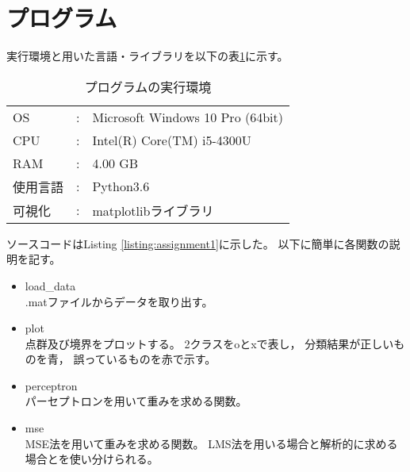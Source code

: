 \documentclass[class=jsarticle, crop=false, dvipdfmx, fleqn]{standalone}
\begin{document}
\section{プログラム}

実行環境と用いた言語・ライブラリを以下の表\ref{tab:cp_env}に示す。

\begin{table}[H]
    \centering
    \caption{プログラムの実行環境}
    \begin{tabular}{lcl}
        OS & : & Microsoft Windows 10 Pro (64bit) \\
        CPU & : & Intel(R) Core(TM) i5-4300U \\
        RAM & : & 4.00 GB \\
        使用言語 & : & Python3.6 \\
        可視化 & : & matplotlibライブラリ
    \end{tabular}
    \label{tab:cp_env}
\end{table}


ソースコードはListing \ref{listing:assignment1}に示した。
以下に簡単に各関数の説明を記す。

\begin{itemize}
    \item load\_data \\
        .matファイルからデータを取り出す。
    \item plot \\
        点群及び境界をプロットする。
        2クラスをoとxで表し，
        分類結果が正しいものを青，
        誤っているものを赤で示す。
    \item perceptron \\
        パーセプトロンを用いて重みを求める関数。
    \item mse \\
        MSE法を用いて重みを求める関数。
        LMS法を用いる場合と解析的に求める場合とを使い分けられる。
\end{itemize}

\end{document}
